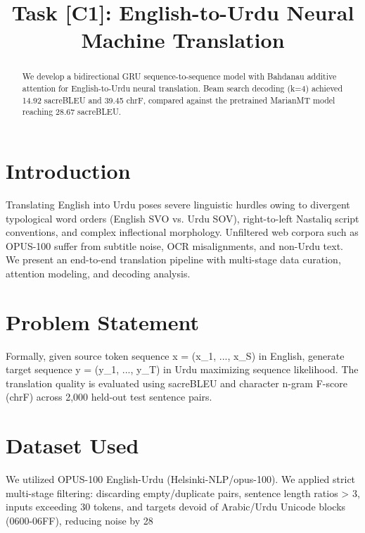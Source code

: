 \documentclass[conference]{IEEEtran}
\begin{document}
\title{Task [C1]: English-to-Urdu Neural Machine Translation}

\author{
}

\maketitle

\begin{abstract}
We develop a bidirectional GRU sequence-to-sequence model with Bahdanau additive attention for English-to-Urdu neural translation. Beam search decoding (k=4) achieved 14.92 sacreBLEU and 39.45 chrF, compared against the pretrained MarianMT model reaching 28.67 sacreBLEU.
\end{abstract}

\section{Introduction}
Translating English into Urdu poses severe linguistic hurdles owing to divergent typological word orders (English SVO vs. Urdu SOV), right-to-left Nastaliq script conventions, and complex inflectional morphology. Unfiltered web corpora such as OPUS-100 suffer from subtitle noise, OCR misalignments, and non-Urdu text. We present an end-to-end translation pipeline with multi-stage data curation, attention modeling, and decoding analysis.

\section{Problem Statement}
Formally, given source token sequence x = (x_1, ..., x_S) in English, generate target sequence y = (y_1, ..., y_T) in Urdu maximizing sequence likelihood. The translation quality is evaluated using sacreBLEU and character n-gram F-score (chrF) across 2,000 held-out test sentence pairs.

\section{Dataset Used}
We utilized OPUS-100 English-Urdu (Helsinki-NLP/opus-100). We applied strict multi-stage filtering: discarding empty/duplicate pairs, sentence length ratios > 3, inputs exceeding 30 tokens, and targets devoid of Arabic/Urdu Unicode blocks (0600-06FF), reducing noise by 28%
\end{document}

